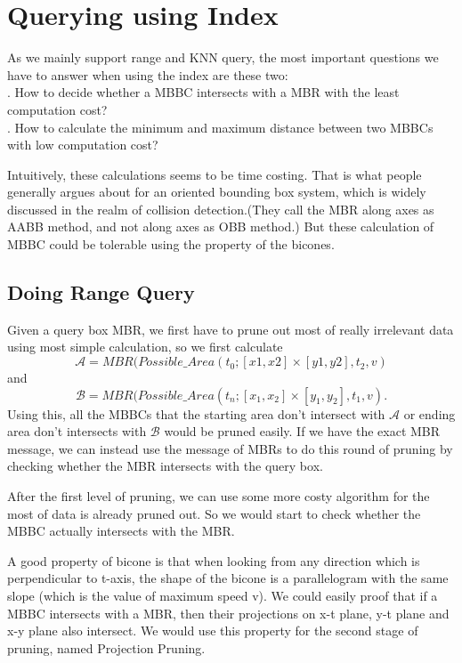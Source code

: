 \documentclass[sigplan]{acmart}
\begin{document}
\section{Querying using Index} \label{sec:query}
As we mainly support range and KNN query, the most important questions we have to answer when using the index are these two:\\
. How to decide whether a MBBC intersects with a MBR with the least computation cost?\\
. How to calculate the minimum and maximum distance between two MBBCs with low computation cost?\par
Intuitively, these calculations seems to be time costing. That is what people generally argues about for an oriented bounding box system, which is widely discussed in the realm of collision detection.(They call the MBR along axes as AABB method, and not along axes as OBB method.) But these calculation of MBBC could be tolerable using the property of the bicones.\par

\subsection{Doing Range Query}

Given a query box MBR, we first have to prune out most of really irrelevant data using most simple calculation, so we first calculate
$$\mathcal{A} = MBR(Possible\_Area(t_0;[x1,x2] \times [y1,y2], t_2, v)$$
and
$$\mathcal{B} = MBR(Possible\_Area(t_n;[x_1,x_2] \times [y_1,y_2], t_1, v).$$
Using this, all the MBBCs that the starting area don't intersect with $\mathcal{A}$ or ending area don't intersects with $\mathcal{B}$ would be pruned easily. If we have the exact MBR message, we can instead use the message of MBRs to do this round of pruning by checking whether the MBR intersects with the query box. \par
After the first level of pruning, we can use some more costy algorithm for the most of data is already pruned out. So we would start to check whether the MBBC actually intersects with the MBR.\par
A good property of bicone is that when looking from any direction which is perpendicular to t-axis, the shape of the bicone is a parallelogram with the same slope (which is the value of maximum speed v). We could easily proof that if a MBBC intersects with a MBR, then their projections on x-t plane, y-t plane and x-y plane also intersect. We would use this property for the second stage of pruning, named Projection Pruning. \par
\end{document}

